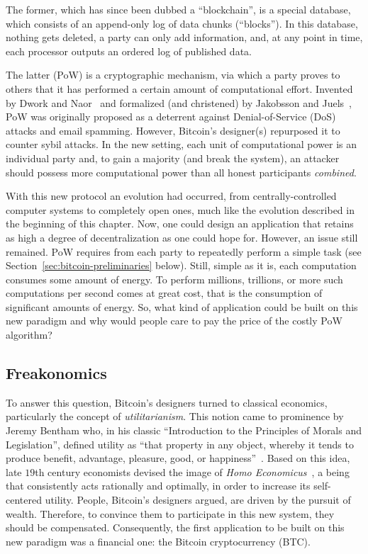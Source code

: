 The former, which has since been dubbed a ``blockchain'', is a special
database, which consists of an append-only log of data chunks (``blocks''). In
this database, nothing gets deleted, \ie a party can only add information, and, at any
point in time, each processor outputs an ordered log of published data.

The latter (PoW) is a cryptographic mechanism, via which a party proves to
others that it has performed a certain amount of computational effort.
Invented by Dwork and Naor~\cite{C:DwoNao92} and formalized (and christened) by
Jakobsson and Juels~\cite{jakobsson1999proofs}, PoW was originally proposed as
a deterrent against Denial-of-Service (DoS) attacks and email spamming.
However, Bitcoin's designer(s) repurposed it to counter sybil attacks. In the
new setting, each unit of computational power is an individual party and, to
gain a majority (and break the system), an attacker should possess more
computational power than all honest participants \emph{combined}.

With this new protocol an evolution had occurred, from centrally-controlled
computer systems to completely open ones, much like the evolution described in
the beginning of this chapter. Now, one could design an application that
retains as high a degree of decentralization as one could hope for. However,
an issue still remained. PoW requires from each party to repeatedly perform a simple
task (see Section~\ref{sec:bitcoin-preliminaries} below). Still, simple as it
is, each computation consumes some amount of energy. To perform millions,
trillions, or more such computations per second comes at great cost, that is the consumption of significant amounts
of energy. So, what kind of application could be built on this
new paradigm and why would people care to pay the price of the costly PoW
algorithm?

\subsection*{Freakonomics}
To answer this question, Bitcoin's designers turned to classical economics,
particularly the concept of \emph{utilitarianism}. This notion came to
prominence by Jeremy Bentham who, in his classic ``Introduction to the
Principles of Morals and Legislation'', defined utility as ``that property in
any object, whereby it tends to produce benefit, advantage, pleasure, good, or
happiness''~\cite{bentham1970introduction}. Based on this idea, late $19$th
century economists devised the image of \emph{Homo
Economicus}~\cite{pareto1971manual}, a being that consistently acts rationally
and optimally, in order to increase its self-centered utility. People,
Bitcoin's designers argued, are driven by the pursuit of wealth. Therefore, to
convince them to participate in this new system, they should be compensated.
Consequently, the first application to be built on this new paradigm was a
financial one: the Bitcoin cryptocurrency (BTC).

